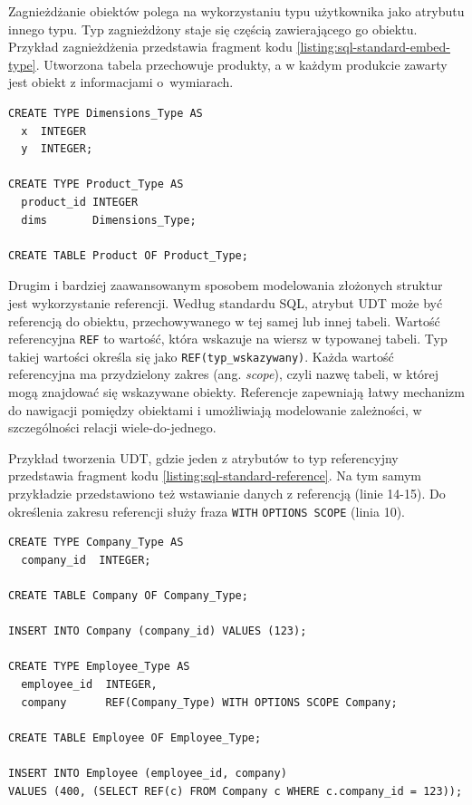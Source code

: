 \documentclass[a4paper,twoside,12pt]{book}
\begin{document}
Zagnieżdżanie obiektów polega na wykorzystaniu typu użytkownika jako atrybutu innego typu. Typ zagnieżdżony staje się częścią zawierającego go obiektu. Przykład zagnieżdżenia przedstawia fragment kodu \ref{listing:sql-standard-embed-type}. Utworzona tabela przechowuje produkty, a w każdym produkcie zawarty jest obiekt z informacjami o~wymiarach. 

\begin{lstlisting}[style=SQL, caption={Zagnieżdżanie typu według standardu SQL.}, label={listing:sql-standard-embed-type}, captionpos=b]
CREATE TYPE Dimensions_Type AS
  x  INTEGER
  y  INTEGER;

CREATE TYPE Product_Type AS
  product_id INTEGER
  dims       Dimensions_Type;
  
CREATE TABLE Product OF Product_Type;
\end{lstlisting}

Drugim i bardziej zaawansowanym sposobem modelowania złożonych struktur jest wykorzystanie referencji. Według standardu SQL, atrybut UDT może być referencją do obiektu, przechowywanego w tej samej lub innej tabeli. Wartość referencyjna \lstinline{REF} to wartość, która wskazuje na wiersz w typowanej tabeli. Typ takiej wartości określa się jako \lstinline{REF(typ_wskazywany)}. Każda wartość referencyjna ma przydzielony zakres (ang. \textit{scope}), czyli nazwę tabeli, w której mogą znajdować się wskazywane obiekty. Referencje zapewniają łatwy mechanizm do nawigacji pomiędzy obiektami i umożliwiają modelowanie zależności, w szczególności relacji wiele-do-jednego. 

Przykład tworzenia UDT, gdzie jeden z atrybutów to typ referencyjny przedstawia fragment kodu \ref{listing:sql-standard-reference}. Na tym samym przykładzie przedstawiono też wstawianie danych z referencją (linie 14-15). Do określenia zakresu referencji służy fraza \lstinline{WITH} \lstinline{OPTIONS SCOPE} (linia 10).

\begin{lstlisting}[style=SQL, caption={Tworzenie typu i tabeli z referencją według standardu SQL.}, label={listing:sql-standard-reference}, captionpos=b]
CREATE TYPE Company_Type AS
  company_id  INTEGER;
  
CREATE TABLE Company OF Company_Type;

INSERT INTO Company (company_id) VALUES (123);

CREATE TYPE Employee_Type AS
  employee_id  INTEGER,
  company      REF(Company_Type) WITH OPTIONS SCOPE Company;

CREATE TABLE Employee OF Employee_Type;

INSERT INTO Employee (employee_id, company) 
VALUES (400, (SELECT REF(c) FROM Company c WHERE c.company_id = 123));
\end{lstlisting}
\end{document}
